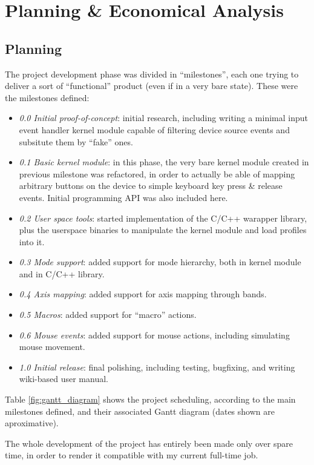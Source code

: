 \chapter{Planning \& Economical Analysis}\label{chap:planning}

\section{Planning}
The project development phase was divided in ``milestones'', each one trying to deliver a sort of ``functional'' product (even if in a very bare state). These were the milestones defined:
\begin{itemize}
	\item \emph{0.0 Initial proof-of-concept}: initial research, including writing a minimal input event handler kernel module capable of filtering device source events and subsitute them by ``fake'' ones.
	\item \emph{0.1 Basic kernel module}: in this phase, the very bare kernel module created in previous milestone was refactored, in order to actually be able of mapping arbitrary buttons on the device to simple keyboard key press \& release events. Initial programming API was also included here.
	\item \emph{0.2 User space tools}: started implementation of the C/C++ warapper library, plus the userspace binaries to manipulate the kernel module and load profiles into it.
	\item \emph{0.3 Mode support}: added support for mode hierarchy, both in kernel module and in C/C++ library.
	\item \emph{0.4 Axis mapping}: added support for axis mapping through bands. 
	\item \emph{0.5 Macros}: added support for ``macro'' actions.
	\item \emph{0.6 Mouse events}: added support for mouse actions, including simulating mouse movement.
	\item \emph{1.0 Initial release}: final polishing, including testing, bugfixing, and writing wiki-based user manual.
\end{itemize}

Table \ref{fig:gantt_diagram} shows the project scheduling, according to the main milestones defined, and their associated Gantt diagram (dates shown are aproximative).

The whole development of the project has entirely been made only over spare time, in order to render it compatible with my current full-time job.

